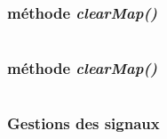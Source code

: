 \documentclass[11pt]{article}
\begin{document}
\begin{appendices}
\subsubsection{méthode \textit{clearMap()}}
\begin{lstlisting}[language=JavaScript]

\end{lstlisting} 
\subsubsection{méthode \textit{clearMap()}}
\begin{lstlisting}[language=JavaScript]

\end{lstlisting} 
\subsubsection{Gestions des signaux}
\begin{lstlisting}[language=JavaScript]

\end{lstlisting} 



\end{appendices}
\end{document}
